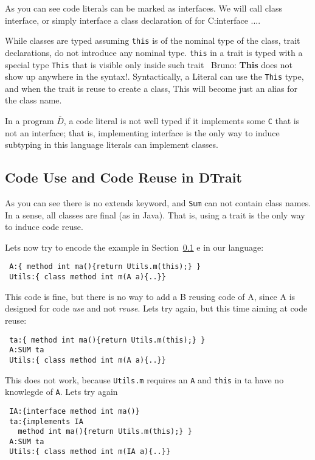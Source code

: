 \documentclass{llncs}
\newcommand{\mynotes}[3]{{\color{#2} {\sc #1}: #3}}
\newcommand\bruno[1]{\mynotes{Bruno}{red}{#1}}
\newcommand\name{{\bf DTrait}\xspace}
\begin{document}
As you can see code literals can be marked as interfaces.  We will call class
interface, or simply interface a class declaration of for C:{interface
  ...}.

While classes are typed assuming \lstinline{this} is of the nominal type of the
class, trait declarations, do not introduce any nominal type.  \lstinline{this}
in a trait is typed with a special type \lstinline{This} that is visible only
inside such trait~\bruno{{\bf This} does not show up anywhere in
  the syntax!}.  Syntactically, a Literal can use the \lstinline{This} type,
and when the trait is reuse to create a class, This will become just
an alias for the class name.

In a program $\overline{D}$, a code literal is not well typed if it
implements some \lstinline{C} that is not an interface; that is,
implementing interface is the only way to induce subtyping in this
language literals can implement classes.

\subsection{Code Use and Code Reuse in \name}

As you can see there is no extends keyword, and \lstinline{Sum} can not contain class names.
In a sense, all classes are final (as in Java).
That is, using a trait is the only way to induce code reuse.

Lets now try to encode the example in Section~\ref{} e in our language:

\begin{lstlisting}
 A:{ method int ma(){return Utils.m(this);} }
 Utils:{ class method int m(A a){..}}
\end{lstlisting} 

This code is fine, but there is no way to add a B reusing code of A, since
A is designed for code \emph{use} and not \emph{reuse}. Lets try
again, but this time aiming at code reuse:

\begin{lstlisting}
 ta:{ method int ma(){return Utils.m(this);} }
 A:SUM ta
 Utils:{ class method int m(A a){..}}
\end{lstlisting}

This does not work, because \lstinline{Utils.m} requires an \lstinline{A} and \lstinline{this} in
ta have no knowlegde of \lstinline{A}. Lets try again

\begin{lstlisting}
 IA:{interface method int ma()}
 ta:{implements IA
   method int ma(){return Utils.m(this);} }
 A:SUM ta
 Utils:{ class method int m(IA a){..}}
\end{lstlisting}
\end{document}
